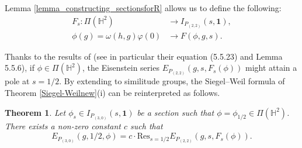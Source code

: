 \documentclass[11pt, reqno]{amsart}
\theoremstyle{plain}
\newtheorem{theorem}{Theorem}[section]
\theoremstyle{definition}
\theoremstyle{remark}
\theoremstyle{plain}
\begin{document}
Lemma \ref{lemma_constructing_sectionsforR} allows us to define the following:
\begin{align*}
    F_s:\Pi(\mathbb{H}^2) & \to I_{P_{(2,2)}}(s, \mathbf{1}),\\ \phi(g) = \omega(h,g)\varphi(0)&\to F(\phi,g,s).
\end{align*}

Thanks to the results of \cite[\S 5.5]{KudlaRallis} (see in particular their equation (5.5.23) and Lemma 5.5.6), if $\phi \in \Pi(\mathbb{H}^2)$, the Eisenstein series $E_{P_{(2,2)}}(g, s, F_s(\phi))$ might attain a pole at $s=1/2$. By extending \cite[Theorem 6.12]{KudlaRallis} to similitude groups, the Siegel--Weil formula of Theorem \ref{Siegel-Weilnew}(i) can be reinterpreted as follows.


\begin{theorem}\label{SWcentralSplit}
    Let $\phi_s \in I_{P_{(3,0)}}\left(s,\mathbf{1}\right)$ be a section such that $ \phi = \phi_{1/2} \in \Pi(\mathbb{H}^2)$. There exists a non-zero constant $c$ such that  
    \[E_{P_{(3,0)}}\left(g,1/2,\phi\right) =c \cdot   \mathrm{Res}_{s = 1/2}E_{P_{(2,2)}}\left(g,s,F_s(\phi)\right).\]
\end{theorem}
\end{document}
